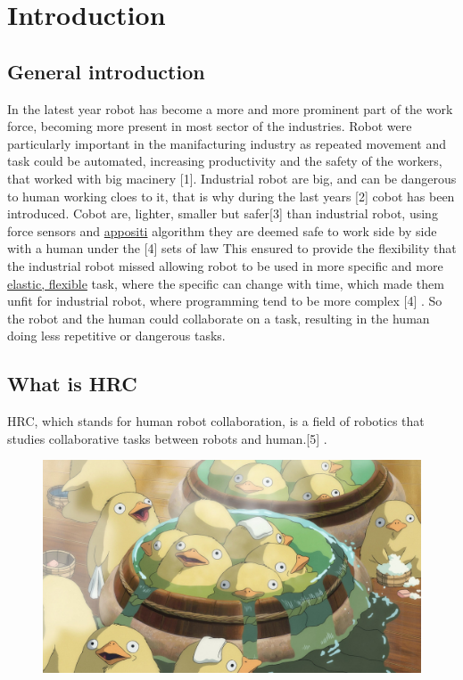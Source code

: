 \chapter*{Introduction}

\section*{General introduction}
In the latest year robot has become a more and more prominent part of the work force, becoming more present in most 
sector of the industries. Robot were particularly important in the manifacturing industry as repeated movement and task
could be automated, increasing productivity and the safety of the workers, that worked with big macinery [1].
Industrial robot are big, and can be dangerous to human working cloes to it, that is why during the last years [2] cobot 
has been introduced. 
Cobot are, lighter, smaller but safer[3] than industrial robot, using force sensors and \underline{appositi} algorithm
they are deemed safe to work side by side with a human under the [4] sets of law 
This ensured to provide the flexibility that the industrial robot missed allowing robot to be used in more specific and 
more \underline{elastic, flexible} task, where the specific can change with time, which made them unfit for industrial 
robot, where programming tend to be more complex [4] \marginpar[4: does it?].
So the robot and the human could collaborate on a task, resulting in the human doing less repetitive or dangerous tasks.

\section*{What is HRC}
HRC, which stands for human robot collaboration, is a field of robotics that studies collaborative tasks between robots 
and human.[5] .



\begin{figure}[H]
    \centering
    \hspace{5 em}
    \includegraphics[width=0.75\linewidth]{figs/quack.jpg}
    \caption{}
    \label{fig:cv_tray}
\end{figure}